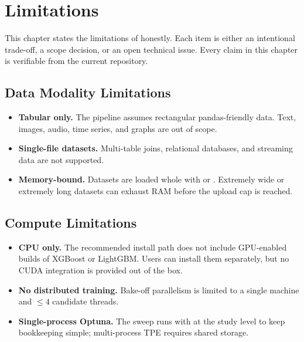 \chapter{Limitations}
\label{ch:limitations}

This chapter states the limitations of \projname{} honestly. Each
item is either an intentional trade-off, a scope decision, or an
open technical issue. Every claim in this chapter is verifiable from
the current repository.

\section{Data Modality Limitations}
\label{sec:lim-data}

\begin{itemize}[leftmargin=1.4em]
  \item \textbf{Tabular only.} The pipeline assumes rectangular
        pandas-friendly data. Text, images, audio, time series,
        and graphs are out of scope.
  \item \textbf{Single-file datasets.} Multi-table joins, relational
        databases, and streaming data are not supported.
  \item \textbf{Memory-bound.} Datasets are loaded whole with
         or . Extremely
        wide or extremely long datasets can exhaust RAM before the
        upload cap is reached.
\end{itemize}

\section{Compute Limitations}
\label{sec:lim-compute}

\begin{itemize}[leftmargin=1.4em]
  \item \textbf{CPU only.} The recommended install path does not
        include GPU-enabled builds of XGBoost or LightGBM. Users can
        install them separately, but no CUDA integration is provided
        out of the box.
  \item \textbf{No distributed training.} Bake-off parallelism is
        limited to a single machine and $\le 4$ candidate threads.
  \item \textbf{Single-process Optuna.} The sweep runs with
         at the study level to keep bookkeeping
        simple; multi-process TPE requires shared storage.
\end{itemize}

